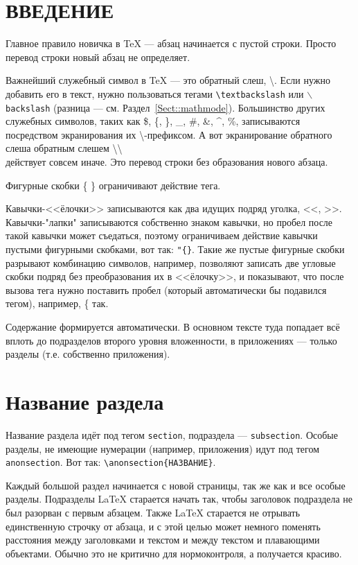\documentclass[14pt,russian]{scrartcl}
\newcommand{\anonsection}[1]{\cleardoublepage
\phantomsection
\addcontentsline{toc}{section}{\protect\numberline{}#1}
\section*{#1}\vspace*{2.5ex} %
}
\begin{document}
\newpage
\renewcommand\contentsname{\hfill{\normalfont{СОДЕРЖАНИЕ}}\hfill}  %
\tableofcontents
\newpage
\anonsection{ВВЕДЕНИЕ}  %

Главное правило новичка в \TeX{} --- абзац начинается с пустой строки. Просто перевод строки новый абзац не определяет.

Важнейший служебный символ в \TeX{} --- это обратный слеш, \textbackslash. Если нужно добавить его в текст, нужно пользоваться тегами \texttt{\textbackslash textbackslash} или \texttt{$\backslash$backslash} (разница --- см. Раздел~\ref{Sect::mathmode}). Большинство других служебных символов, таких как \$, \{, \}, \_, \#, \&, \^{}, \%, записываются посредством экранирования их  \textbackslash -префиксом. А вот экранирование обратного слеша обратным слешем \textbackslash \textbackslash{} \\ действует совсем иначе. Это перевод строки без образования нового абзаца.

Фигурные скобки \{ \} ограничивают действие тега. 

Кавычки-<<ёлочки>> записываются как два идущих подряд уголка, <{}<, >{}>. Кавычки-"лапки"{} записываются собственно знаком кавычки, но пробел после такой кавычки может съедаться, поэтому ограничиваем действие кавычки пустыми фигурными скобками, вот так: \texttt{"\{\}}. Такие же пустые фигурные скобки разрывают комбинацию символов, например, позволяют записать две угловые скобки подряд без преобразования их в <<ёлочку>>, и показывают, что после вызова тега нужно поставить пробел (который автоматически бы подавился тегом), например, \{{} так.

Содержание формируется автоматически. В основном тексте туда попадает всё вплоть до подразделов второго уровня вложенности, в приложениях --- только разделы (т.е. собственно приложения).

\section{Название раздела}

Название раздела идёт под тегом \texttt{section}, подраздела --- \texttt{subsection}. Особые разделы, не имеющие нумерации (например, приложения) идут под тегом \texttt{anonsection}. Вот так: \texttt{\textbackslash anonsection\{НАЗВАНИЕ\}}.

Каждый большой раздел начинается с новой страницы, так же как и все особые разделы. Подразделы \LaTeX{} старается начать так, чтобы заголовок подраздела не был разорван с первым абзацем. Также \LaTeX{} старается не отрывать единственную строчку от абзаца, и с этой целью может немного поменять расстояния между заголовками и текстом и между текстом и плавающими объектами. Обычно это не критично для нормоконтроля, а получается красиво.
\end{document}
